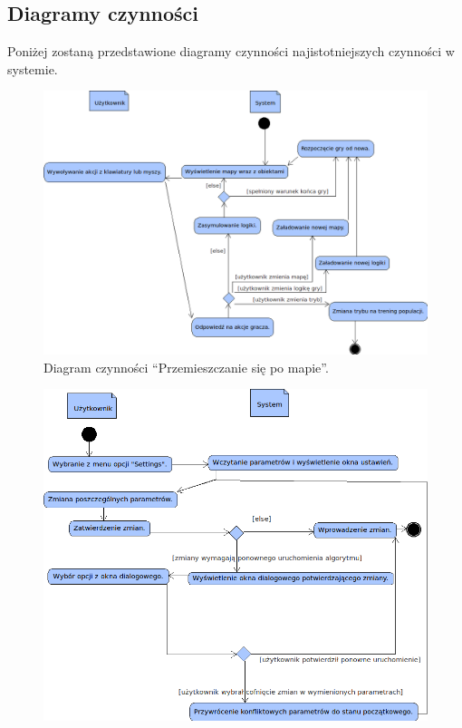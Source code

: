 \subsection{Diagramy czynności}
\begin{par}
		Poniżej zostaną przedstawione diagramy czynności najistotniejszych czynności w systemie.
		\begin{figure}[!h]
		\centering
		\includegraphics[width=\textwidth]{obrazki/activity_diagram.png}
		\caption{Diagram czynności ``Przemieszczanie się po mapie''.}
		\label{fig:sterowanie}
		\end{figure}
		\begin{figure}[!h]
		\centering
		\includegraphics[width=\textwidth]{obrazki/activity_diagram_2.png}

\end{figure}
\end{par}
